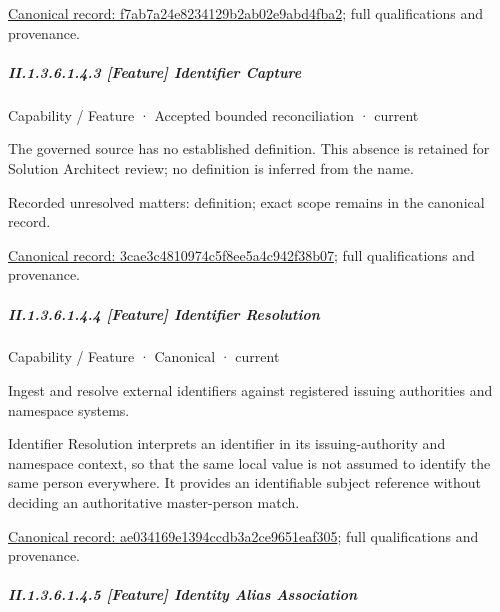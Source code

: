 {\footnotesize \href{../../../../continuum/strategy/capability/feature/f7ab7a24e8234129b2ab02e9abd4fba2.md}{Canonical record: f7ab7a24e8234129b2ab02e9abd4fba2}; full qualifications and provenance.}\par
\subparagraph*{II.1.3.6.1.4.3 [Feature] Identifier Capture}
\label{navigation:II.1.3.6.1.4.3}

\label{element:3cae3c4810974c5f8ee5a4c942f38b07}
{\small Capability / Feature · Accepted bounded reconciliation · current}\par

The governed source has no established definition. This absence is retained for Solution Architect review; no definition is inferred from the name.


{\small Recorded unresolved matters: definition; exact scope remains in the canonical record.}\par
{\footnotesize \href{../../../../continuum/strategy/capability/feature/3cae3c4810974c5f8ee5a4c942f38b07.md}{Canonical record: 3cae3c4810974c5f8ee5a4c942f38b07}; full qualifications and provenance.}\par
\subparagraph*{II.1.3.6.1.4.4 [Feature] Identifier Resolution}
\label{navigation:II.1.3.6.1.4.4}

\label{element:ae034169e1394ccdb3a2ce9651eaf305}
{\small Capability / Feature · Canonical · current}\par

Ingest and resolve external identifiers against registered issuing authorities and namespace systems.



Identifier Resolution interprets an identifier in its issuing-authority and namespace context, so that the same local value is not assumed to identify the same person everywhere. It provides an identifiable subject reference without deciding an authoritative master-person match.


{\footnotesize \href{../../../../continuum/strategy/capability/feature/ae034169e1394ccdb3a2ce9651eaf305.md}{Canonical record: ae034169e1394ccdb3a2ce9651eaf305}; full qualifications and provenance.}\par
\subparagraph*{II.1.3.6.1.4.5 [Feature] Identity Alias Association}
\label{navigation:II.1.3.6.1.4.5}

